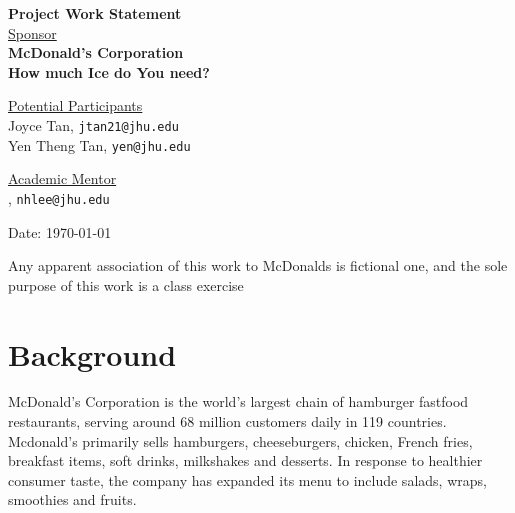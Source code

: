 \documentclass[12pt,letterpaper]{article}
\theoremstyle{definition}
\begin{document}
\def\shiftdowna{0.32in}  %
\def\shiftdownb{0.22in}  %


\begin{center}
\textbf{{\large Project Work Statement}}\\


\vspace \shiftdowna
\underline {Sponsor}\\ 
\vspace{5pt}
\textbf{{\large McDonald's Corporation}}\\


\vspace \shiftdowna
\textbf{{\large How much Ice do You need?}}

\vspace \shiftdownb
\underline {Potential Participants}\\
\vspace{5pt}
Joyce Tan, \texttt{jtan21@jhu.edu} \\
\vspace{2pt}
Yen Theng Tan, \texttt{yen@jhu.edu} \\
\vspace{2pt}

\vspace{0.35in}
\vspace \shiftdownb
\underline {Academic Mentor} \\
\vspace{5pt}
, \texttt{nhlee@jhu.edu}

\vspace \shiftdowna
Date: \today

\end{center}

\vfill  
\footnoterule
\noindent \small{Any apparent association of this work to McDonalds is
fictional one, and the sole purpose of this work is a class exercise}

\newpage

\section{Background} 
McDonald's Corporation is the world's largest chain of hamburger fastfood restaurants, serving around 68 million customers daily in 119 countries. Mcdonald's primarily sells hamburgers, cheeseburgers, chicken, French fries, breakfast items, soft drinks, milkshakes and desserts. In response to healthier consumer taste, the company has expanded its menu to include salads, wraps,
smoothies and fruits.
\end{document}
